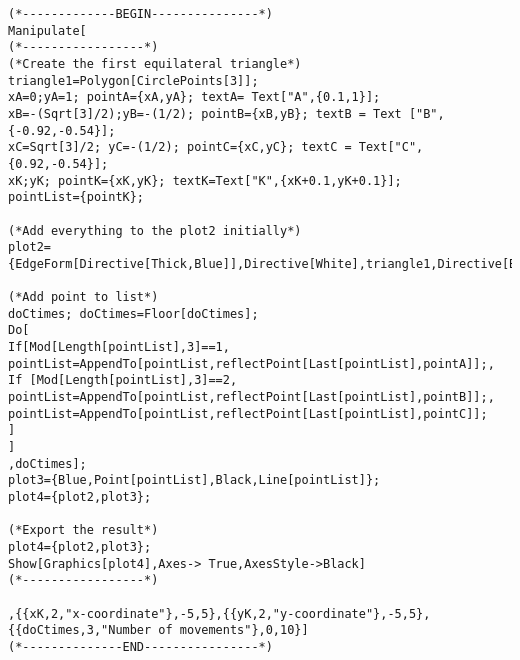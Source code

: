 \documentclass[11pt, a4paper]{article}
\begin{document}
\lstset{language=Mathematica}
\begin{lstlisting}
(*-------------BEGIN---------------*)
Manipulate[
(*-----------------*)
(*Create the first equilateral triangle*)
triangle1=Polygon[CirclePoints[3]];
xA=0;yA=1; pointA={xA,yA}; textA= Text["A",{0.1,1}];
xB=-(Sqrt[3]/2);yB=-(1/2); pointB={xB,yB}; textB = Text ["B",{-0.92,-0.54}];
xC=Sqrt[3]/2; yC=-(1/2); pointC={xC,yC}; textC = Text["C",{0.92,-0.54}];
xK;yK; pointK={xK,yK}; textK=Text["K",{xK+0.1,yK+0.1}];
pointList={pointK};

(*Add everything to the plot2 initially*)
plot2={EdgeForm[Directive[Thick,Blue]],Directive[White],triangle1,Directive[Black],Point[pointA],Point[pointB],Point[pointC],textA,textB,textC,PointSize[0.02],Point[pointK],textK};

(*Add point to list*)
doCtimes; doCtimes=Floor[doCtimes];
Do[
If[Mod[Length[pointList],3]==1,
pointList=AppendTo[pointList,reflectPoint[Last[pointList],pointA]];,
If [Mod[Length[pointList],3]==2,
pointList=AppendTo[pointList,reflectPoint[Last[pointList],pointB]];,
pointList=AppendTo[pointList,reflectPoint[Last[pointList],pointC]];
]
]
,doCtimes];
plot3={Blue,Point[pointList],Black,Line[pointList]};
plot4={plot2,plot3};

(*Export the result*)
plot4={plot2,plot3};
Show[Graphics[plot4],Axes-> True,AxesStyle->Black]
(*-----------------*)

,{{xK,2,"x-coordinate"},-5,5},{{yK,2,"y-coordinate"},-5,5},{{doCtimes,3,"Number of movements"},0,10}]
(*--------------END----------------*)
\end{lstlisting}
\end{document}
